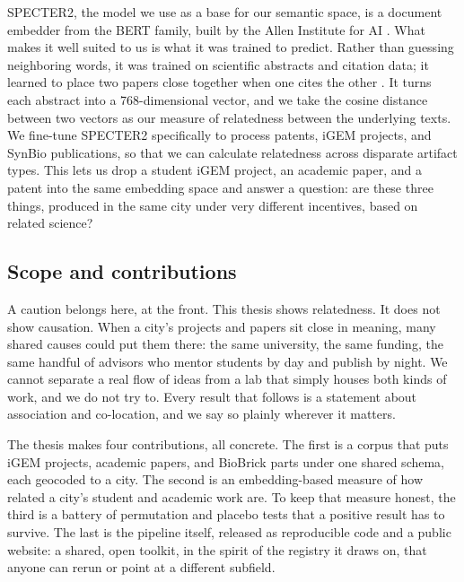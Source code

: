 \documentclass[12pt,a4paper]{article}
\begin{document}
	SPECTER2, the model we use as a base for our semantic space, is a document embedder from the BERT family, built by the Allen Institute for AI \parencite{singhSciRepEvalMultiFormat2023}. What makes it well suited to us is what it was trained to predict. Rather than guessing neighboring words, it was trained on scientific abstracts and citation data; it learned to place two papers close together when one cites the other \parencite{cohanDocumentlevelRepresentation2020}. It turns each abstract into a 768-dimensional vector, and we take the cosine distance between two vectors as our measure of relatedness between the underlying texts. We fine-tune SPECTER2 specifically to process patents, iGEM projects, and SynBio publications, so that we can calculate relatedness across disparate artifact types. This lets us drop a student iGEM project, an academic paper, and a patent into the same embedding space and answer a question: are these three things, produced in the same city under very different incentives, based on related science? 
	
	\subsection{Scope and contributions}
	
	A caution belongs here, at the front. This thesis shows relatedness. It does not
	show causation. When a city's projects and papers sit close in meaning, many
	shared causes could put them there: the same university, the same funding, the
	same handful of advisors who mentor students by day and publish by night. We
	cannot separate a real flow of ideas from a lab that simply houses both kinds of
	work, and we do not try to. Every result that follows is a statement about
	association and co-location, and we say so plainly wherever it matters.
	
	The thesis makes four contributions, all concrete. The first is a corpus that puts
	iGEM projects, academic papers, and BioBrick parts under one shared schema, each
	geocoded to a city. The second is an embedding-based measure of how related a city's
	student and academic work are. To keep that measure honest, the third is a battery of
	permutation and placebo tests that a positive result has to survive. The last is the
	pipeline itself, released as reproducible code and a public website: a shared, open
	toolkit, in the spirit of the registry it draws on, that anyone can rerun or point at
	a different subfield.
	
\end{document}
